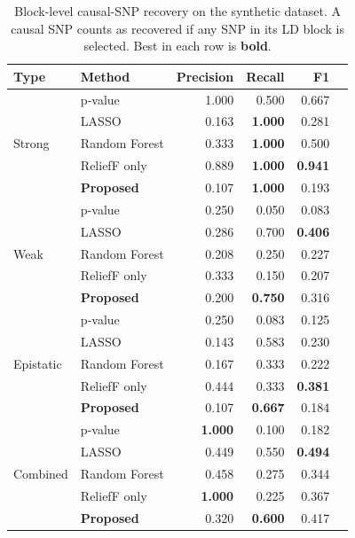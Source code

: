 \documentclass[11pt,a4paper]{article}
\begin{document}
\begin{table}[H]
\centering
\caption{Block-level causal-SNP recovery on the synthetic dataset.
A causal SNP counts as recovered if any SNP in its LD block is
selected. Best in each row is \textbf{bold}.\label{tab:recovery}}
\begin{tabular}{l l r r r r}
\toprule
\textbf{Type} & \textbf{Method} & \textbf{Precision} & \textbf{Recall} & \textbf{F1} \\
\midrule
\multirow{5}{*}{Strong}   & p-value          & 1.000 & 0.500 & 0.667 \\
                          & LASSO            & 0.163 & \textbf{1.000} & 0.281 \\
                          & Random Forest    & 0.333 & \textbf{1.000} & 0.500 \\
                          & ReliefF only     & 0.889 & \textbf{1.000} & \textbf{0.941} \\
                          & \textbf{Proposed}& 0.107 & \textbf{1.000} & 0.193 \\
\midrule
\multirow{5}{*}{Weak}     & p-value          & 0.250 & 0.050 & 0.083 \\
                          & LASSO            & 0.286 & 0.700 & \textbf{0.406} \\
                          & Random Forest    & 0.208 & 0.250 & 0.227 \\
                          & ReliefF only     & 0.333 & 0.150 & 0.207 \\
                          & \textbf{Proposed}& 0.200 & \textbf{0.750} & 0.316 \\
\midrule
\multirow{5}{*}{Epistatic}& p-value          & 0.250 & 0.083 & 0.125 \\
                          & LASSO            & 0.143 & 0.583 & 0.230 \\
                          & Random Forest    & 0.167 & 0.333 & 0.222 \\
                          & ReliefF only     & 0.444 & 0.333 & \textbf{0.381} \\
                          & \textbf{Proposed}& 0.107 & \textbf{0.667} & 0.184 \\
\midrule
\multirow{5}{*}{Combined} & p-value          & \textbf{1.000} & 0.100 & 0.182 \\
                          & LASSO            & 0.449 & 0.550 & \textbf{0.494} \\
                          & Random Forest    & 0.458 & 0.275 & 0.344 \\
                          & ReliefF only     & \textbf{1.000} & 0.225 & 0.367 \\
                          & \textbf{Proposed}& 0.320 & \textbf{0.600} & 0.417 \\
\bottomrule
\end{tabular}
\end{table}
\end{document}
